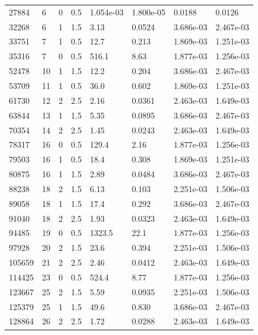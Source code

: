 \documentclass[preview]{standalone}
\begin{document}
{{\begin{tabular}{L{1.2cm}C{1.2cm} C{0.3cm}C{0.5cm} C{1.4cm}C{1.4cm} C{1.4cm}C{1.4cm}}
  27884  &     6  & 0     & 0.5 &  1.054e-03  & 1.800e-05  & 0.0188 &  0.0126   \\ 
  32268  &     6  & 1     & 1.5 &  3.13  & 0.0524  & 3.686e-03 &  2.467e-03   \\ 
  33751  &     7  & 1     & 0.5 &  12.7  & 0.213  & 1.869e-03 &  1.251e-03   \\ 
  35316  &     7  & 0     & 0.5 &  516.1  & 8.63  & 1.877e-03 &  1.256e-03   \\ 
  52478  &    10  & 1     & 1.5 &  12.2  & 0.204  & 3.686e-03 &  2.467e-03   \\ 
  53709  &    11  & 1     & 0.5 &  36.0  & 0.602  & 1.869e-03 &  1.251e-03   \\ 
  61730  &    12  & 2     & 2.5 &  2.16  & 0.0361  & 2.463e-03 &  1.649e-03   \\ 
  63844  &    13  & 1     & 1.5 &  5.35  & 0.0895  & 3.686e-03 &  2.467e-03   \\ 
  70354  &    14  & 2     & 2.5 &  1.45  & 0.0243  & 2.463e-03 &  1.649e-03   \\ 
  78317  &    16  & 0     & 0.5 &  129.4  & 2.16  & 1.877e-03 &  1.256e-03   \\ 
  79503  &    16  & 1     & 0.5 &  18.4  & 0.308  & 1.869e-03 &  1.251e-03   \\ 
  80875  &    16  & 1     & 1.5 &  2.89  & 0.0484  & 3.686e-03 &  2.467e-03   \\ 
  88238  &    18  & 2     & 1.5 &  6.13  & 0.103  & 2.251e-03 &  1.506e-03   \\ 
  89058  &    18  & 1     & 1.5 &  17.4  & 0.292  & 3.686e-03 &  2.467e-03   \\ 
  91040  &    18  & 2     & 2.5 &  1.93  & 0.0323  & 2.463e-03 &  1.649e-03   \\ 
  94485  &    19  & 0     & 0.5 &  1323.5  & 22.1  & 1.877e-03 &  1.256e-03   \\ 
  97928  &    20  & 2     & 1.5 &  23.6  & 0.394  & 2.251e-03 &  1.506e-03   \\ 
  105659  &    21  & 2     & 2.5 &  2.46  & 0.0412  & 2.463e-03 &  1.649e-03   \\ 
  114425  &    23  & 0     & 0.5 &  524.4  & 8.77  & 1.877e-03 &  1.256e-03   \\ 
  123667  &    25  & 2     & 1.5 &  5.59  & 0.0935  & 2.251e-03 &  1.506e-03   \\ 
  125379  &    25  & 1     & 1.5 &  49.6  & 0.830  & 3.686e-03 &  2.467e-03   \\ 
  128864  &    26  & 2     & 2.5 &  1.72  & 0.0288  & 2.463e-03 &  1.649e-03   \\ 

\end{tabular}}}
\end{document}

